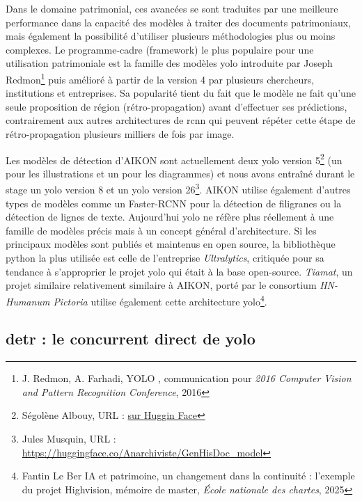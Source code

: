 Dans le domaine patrimonial, ces avancées se sont traduites par une meilleure performance dans la capacité des modèles à traiter des documents patrimoniaux, mais également la possibilité d'utiliser plusieurs méthodologies plus ou moins complexes. Le programme-cadre (framework) le plus populaire pour une utilisation patrimoniale est la famille des modèles \gls{yolo}  introduite par Joseph Redmon\footnote{J. Redmon, A. Farhadi, \og YOLO \fg, communication pour \textit{2016 Computer Vision and Pattern Recognition Conference}, 2016} puis amélioré à partir de la version 4 par plusieurs chercheurs, institutions et entreprises. Sa popularité tient du fait que le modèle ne fait qu'une seule proposition de région (rétro-propagation) avant d'effectuer ses prédictions, contrairement aux autres architectures de \gls{rcnn} qui peuvent répéter cette étape de rétro-propagation plusieurs milliers de fois par image. 

Les modèles de détection d'AIKON sont actuellement deux \gls{yolo} version 5\footnote{Ségolène Albouy, URL : \href{https://huggingface.co/seglinglin/Historical-Illustration-Extraction/tree/main}{sur Huggin Face}} (un pour les illustrations et un pour les diagrammes) et nous avons entraîné durant le stage un \gls{yolo} version 8 et un \gls{yolo} version 26\footnote{Jules Musquin, URL : \href{https://huggingface.co/Anarchiviste/GenHisDoc_model}{https://huggingface.co/Anarchiviste/GenHisDoc\_model}}.  AIKON utilise également d'autres types de modèles comme un Faster-RCNN pour la détection de filigranes ou la détection de lignes de texte. Aujourd'hui \gls{yolo} ne réfère plus réellement à une famille de modèles précis mais à un concept général d'architecture. Si les principaux modèles sont publiés et maintenus en open source, la bibliothèque python la plus utilisée est celle de l'entreprise \textit{Ultralytics}, critiquée pour sa tendance à s'approprier le projet \gls{yolo} qui était à la base open-source. \textit{Tiamat}, un projet similaire relativement similaire à AIKON, porté par le consortium \textit{HN-Humanum Pictoria} utilise également cette architecture \gls{yolo}\footnote{Fantin Le Ber \og IA et patrimoine, un changement dans la continuité : l’exemple du projet Highvision\fg, mémoire de master, \textit{École nationale des chartes}, 2025}. 


\subsection{\gls{detr} : le concurrent direct de \gls{yolo}}

